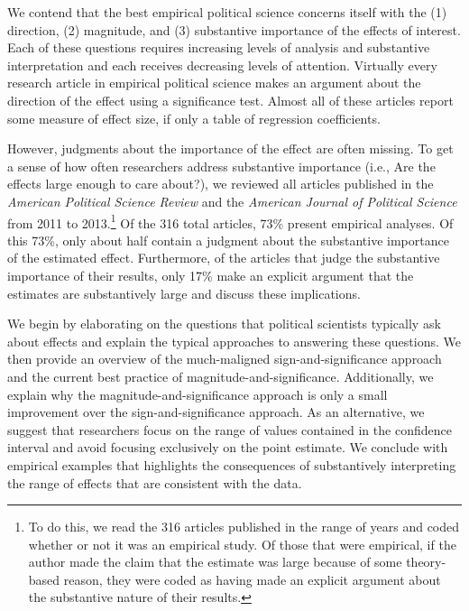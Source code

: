 \documentclass[12pt]{article}
\begin{document}
We contend that the best empirical political science concerns itself with the (1) direction, (2) magnitude, and (3) substantive importance of the effects of interest. Each of these questions requires increasing levels of analysis and substantive interpretation and each receives decreasing levels of attention. Virtually every research article in empirical political science makes an argument about the direction of the effect using a significance test. Almost all of these articles report some measure of effect size, if only a table of regression coefficients. 

However, judgments about the importance of the effect are often missing. To get a sense of how often researchers address substantive importance (i.e., Are the effects large enough to care about?), we reviewed all articles published in the \textit{American Political Science Review} and the \textit{American Journal of Political Science} from 2011 to 2013.\footnote{To do this, we read the 316 articles published in the range of years and coded whether or not it was an empirical study. Of those that were empirical, if the author made the claim that the estimate was large because of some theory-based reason, they were coded as having made an explicit argument about the substantive nature of their results.}  Of the 316 total articles, 73\% present empirical analyses. Of this 73\%, only about half contain a judgment about the substantive importance of the estimated effect. Furthermore, of the articles that judge the substantive importance of their results, only 17\% make an explicit argument that the estimates are substantively large and discuss these implications.

We begin by elaborating on the questions that political scientists typically ask about effects and explain the typical approaches to answering these questions. We then provide an overview of the much-maligned sign-and-significance approach and the current best practice of magnitude-and-significance. Additionally, we explain why the magnitude-and-significance approach is only a small improvement over the sign-and-significance approach. As an alternative, we suggest that researchers focus on the range of values contained in the confidence interval and avoid focusing exclusively on the point estimate. We conclude with empirical examples that highlights the consequences of substantively interpreting the range of effects that are consistent with the data.
\end{document}
